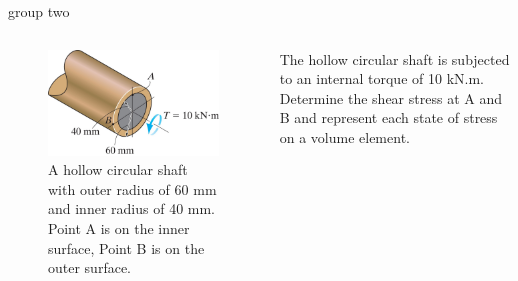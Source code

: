 \documentclass[
  letterpaper,
  ignorenonframetext,
  aspectratio=43,
  handout,
  12pt]{beamer}
\let\Oldincludegraphics\includegraphics
\renewcommand{\includegraphics}[2][]{\Oldincludegraphics[width=\textwidth,height=0.7\textheight,keepaspectratio]{#2}}
\begin{document}
\begin{frame}{group two}
\protect\hypertarget{group-two}{}
\begin{columns}[T]
\begin{column}{0.5\textwidth}
\begin{figure}
\centering
\includegraphics{../images/group5-2.jpg}
\caption{A hollow circular shaft with outer radius of 60 mm and inner
radius of 40 mm. Point A is on the inner surface, Point B is on the
outer surface.}
\end{figure}
\end{column}

\begin{column}{0.5\textwidth}
The hollow circular shaft is subjected to an internal torque of 10 kN.m.
Determine the shear stress at A and B and represent each state of stress
on a volume element.
\end{column}
\end{columns}
\end{frame}
\end{document}
